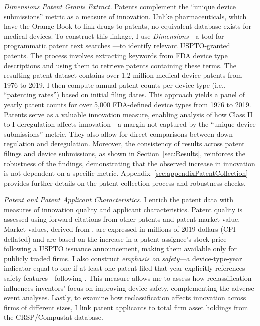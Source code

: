 \documentclass[letterpaper,12pt]{article}
\theoremstyle{definition}
\begin{document}
\textit{Dimensions Patent Grants Extract.} 
Patents complement the ``unique device submissions'' metric as a measure of innovation. Unlike pharmaceuticals, which have the Orange Book to link drugs to patents, no equivalent database exists for medical devices. To construct this linkage, I use \textit{Dimensions}---a tool for programmatic patent text searches \citep{Dimensions}---to identify relevant USPTO-granted patents. The process involves extracting keywords from FDA device type descriptions and using them to retrieve patents containing these terms. The resulting patent dataset contains over 1.2 million medical device patents from 1976 to 2019. I then compute annual patent counts per device type (i.e., ``patenting rates'') based on initial filing dates. This approach yields a panel of yearly patent counts for over 5,000 FDA-defined device types from 1976 to 2019. Patents serve as a valuable innovation measure, enabling analysis of how Class II to I deregulation affects innovation---a margin not captured by the ``unique device submissions'' metric. They also allow for direct comparisons between down-regulation and deregulation. Moreover, the consistency of results across patent filings and device submissions, as shown in Section~\ref{sec:Results}, reinforces the robustness of the findings, demonstrating that the observed increase in innovation is not dependent on a specific metric. Appendix~\ref{sec:appendixPatentCollection} provides further details on the patent collection process and robustness checks.




\textit{Patent and Patent Applicant Characteristics.} I enrich the patent data with measures of innovation quality and applicant characteristics. Patent quality is assessed using forward citations from other patents and patent market value.\footnotemark {} Market values, derived from \citet{kogan:2017}, are expressed in millions of 2019 dollars (CPI-deflated) and are based on the increase in a patent assignee’s stock price following a USPTO issuance announcement, making them available only for publicly traded firms. I also construct \textit{emphasis on safety}---a device-type-year indicator equal to one if at least one patent filed that year explicitly references safety features---following \citet{clemens2020demand}.\footnotemark {} This measure allows me to assess how reclassification influences inventors' focus on improving device safety, complementing the adverse event analyses. Lastly, to examine how reclassification affects innovation across firms of different sizes, I link patent applicants to total firm asset holdings from the CRSP/Compustat database.
\end{document}
